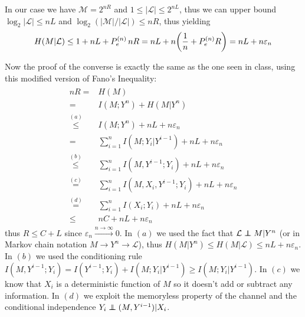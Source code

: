 In our case we have $\mathcal{M}=2^{nR}$ and $1\leq |\mathcal{L}| \leq 2^{nL}$, thus we can upper bound $\log_2|\mathcal{L}| \leq nL$ and $\log_2(|\mathcal{M}|/|\mathcal{L}|) \leq nR$, thus yielding
%
\begin{equation}
H(M|\mathcal{L}) \leq 1+nL+P_e^{(n)} \, nR = nL + n\qty(\frac{1}{n} + P_e^{(n)} R) = nL + n\varepsilon_n
\end{equation}

Now the proof of the converse is exactly the same as the one seen in class, using this modified version of Fano's Inequality:
%
\begin{align}
\begin{split}
nR =& H(M)\\
=&  I(M;Y^n) + H(M|Y^n)\\
\stackrel{(a)}{\leq}& I(M;Y^n) + nL + n\varepsilon_n\\
=& \sum_{i=1}^n I(M;Y_i|Y^{i-1}) + nL+n\varepsilon_n\\
\stackrel{(b)}{\leq}& \sum_{i=1}^n I(M,Y^{i-1};Y_i) + nL+n\varepsilon_n\\
\stackrel{(c)}{=}& \sum_{i=1}^n I(M,X_i,Y^{i-1};Y_i) + nL+n\varepsilon_n\\
\stackrel{(d)}{=}& \sum_{i=1}^n I(X_i;Y_i) + nL+n\varepsilon_n\\
\leq& nC + nL+n\varepsilon_n
\end{split}
\end{align}
%
thus $R\leq C+L$ since $\varepsilon_n \xrightarrow{n\rightarrow\infty} 0$. In $(a)$ we used the fact that $\mathcal{L} \independent M |Y^n$ (or in Markov chain notation $M\rightarrow Y^n\rightarrow \mathcal{L}$), thus $H(M|Y^n)\leq H(M|\mathcal{L}) \leq nL + n\varepsilon_n$. In $(b)$ we used the conditioning rule $I(M,Y^{i-1};Y_i) = I(Y^{i-1};Y_i) + I(M;Y_i|Y^{i-1}) \geq I(M;Y_i|Y^{i-1})$. In $(c)$ we know that $X_i$ is a deterministic function of $M$ so it doesn't add or subtract any information. In $(d)$ we exploit the memoryless property of the channel and the conditional independence $Y_i \independent (M,Y^{i-1})|X_i$.

